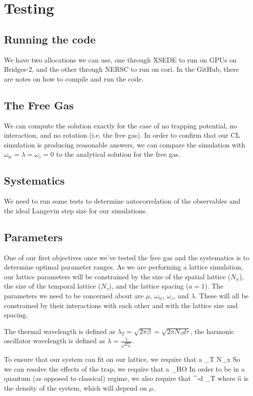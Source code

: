 \documentclass[../../RotatingBosons.tex]{subfiles}
\begin{document}
\section{Testing}
\subsection{Running the code}
We have two allocations we can use, one through XSEDE to run on GPUs on Bridges-2, and the other through NERSC to run on cori. In the GitHub, there are notes on how to compile and run the code.

\subsection{The Free Gas}
We can compute the solution exactly for the case of no trapping potential, no interaction, and no rotation (i.e. the free gas). In order to confirm that our CL simulation is producing reasonable answers, we can compare the simulation with $\omega_{\mathrm{tr}} = \lambda = \omega_{z} = 0$ to the analytical solution for the free gas.

\subsection{Systematics}
We need to run some tests to determine autocorrelation of the observables and the ideal Langevin step size for our simulations.

\subsection{Parameters}
One of our first objectives once we've tested the free gas and the systematics is to determine optimal parameter ranges. As we are performing a lattice simulation, our lattice parameters will be constrained by the size of the spatial lattice ($N_{x}$), the size of the temporal lattice ($N_{\tau}$), and the lattice spacing ($a=1$). The parameters we need to be concerned about are $\mu$, $\omega_{\mathrm{tr}}$, $\omega_{z}$, and $\lambda$. These will all be constrained by their interactions with each other and with the lattice size and spacing.

The thermal wavelength is defined as $\lambda_{T} = \sqrt{2 \pi \beta} = \sqrt{2 \pi N_{\tau} d\tau}$, the harmonic oscillator wavelength is defined as $\lambda = \frac{1}{\sqrt{\omega_{\mathrm{tr}}}}$. 

To ensure that our system can fit on our lattice, we require that
%
\beq
a \ll \lambda_{T} \ll N_{x}
\eeq
%
So we can resolve the effects of the trap, we require that 
%
\beq
a \ll \lambda_{HO}
\eeq
%
In order to be in a quantum (as opposed to classical) regime, we also require that
%
\beq
{}^{-d} \ll \lambda_{T}
\eeq
%
where $\hat{n}$ is the density of the system, which will depend on $\mu$.
\end{document}
